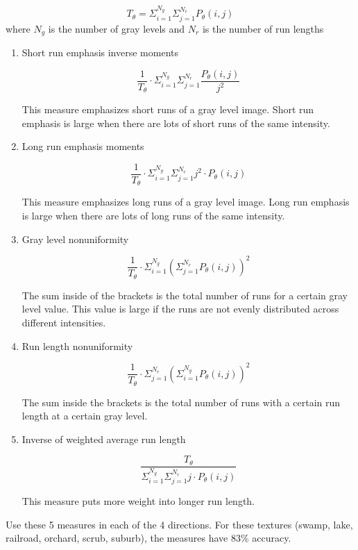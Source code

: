\documentclass{article}
\begin{document}
\begin{multicols}{2}
\[T_\theta = \Sigma_{i=1} ^{N_g} \Sigma_{j=1} ^{N_r} P_\theta(i,j)\]
where $N_g$ is the number of gray levels and $N_r$ is the number of run lengths

\begin{enumerate}
  \item {Short run emphasis inverse moments}
  
  \[\frac{1}{T_\theta} \cdot \Sigma_{i=1} ^{N_g} \Sigma_{j=1} ^{N_r} \frac{P_\theta (i,j)}{j^2}\]

  This measure emphasizes short runs of a gray level image. Short run emphasis is large when there are lots of short runs of the same intensity.

  \item {Long run emphasis moments}
  
  \[\frac{1}{T_\theta} \cdot \Sigma_{i=1} ^{N_g} \Sigma_{j=1} ^{N_r} j^2 \cdot P_\theta (i,j)\]

  This measure emphasizes long runs of a gray level image. Long run emphasis is large when there are lots of long runs of the same intensity.

  \item {Gray level nonuniformity}
  
  \[\frac{1}{T_\theta} \cdot \Sigma_{i=1} ^{N_g} (\Sigma_{j=1} ^{N_r} P_\theta (i,j))^2\]

  The sum inside of the brackets is the total number of runs for a certain gray level value. This value is large if the runs are not evenly distributed across different intensities.

  \item {Run length nonuniformity}
  
  \[\frac{1}{T_\theta} \cdot \Sigma_{j=1} ^{N_r} (\Sigma_{i=1} ^{N_g} P_\theta (i,j))^2\]

  The sum inside the brackets is the total number of runs with a certain run length at a certain gray level.

  \item {Inverse of weighted average run length}
  
\[\frac{T_\theta}{\Sigma_{i=1} ^{N_g} \Sigma_{j=1} ^{N_r} j \cdot P_\theta (i,j)}\]

This measure puts more weight into longer run length.

\end{enumerate}

Use these 5 measures in each of the 4 directions. For these textures (swamp, lake, railroad, orchard, scrub, suburb), the measures have 83$\%$ accuracy.


\end{multicols}
\end{document}
